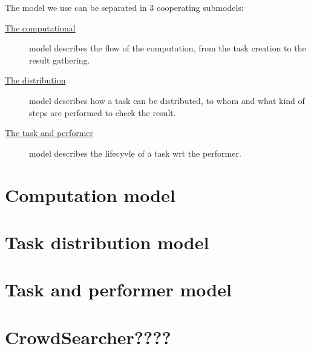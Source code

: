 The model we use can be separated in 3 cooperating submodels:
\begin{description}
	\item[{\hyperref[sec:model:computation]{The computational}}] model describes the flow of
	the computation, from the task creation to the result gathering.

	\item[{\hyperref[sec:model:distribution]{The distribution}}] model describes how a task
	can be distributed, to whom and what kind of steps are performed to check the result.
	
	\item[{\hyperref[sec:model:performer]{The task and performer}}] model describes the
	lifecyvle of a task wrt the performer.
\end{description}









\section{Computation model}
\label{sec:model:computation}


\section{Task distribution model}
\label{sec:model:distribution}


\section{Task and performer model}
\label{sec:model:performer}



\section{CrowdSearcher????}
\label{sec:model:cs}
